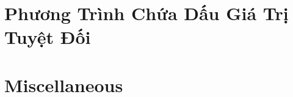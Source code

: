 \documentclass{article}
\begin{document}

\section{Phương Trình Chứa Dấu Giá Trị Tuyệt Đối}


\section{Miscellaneous}


\printbibliography[heading=bibintoc]
	
\end{document}
